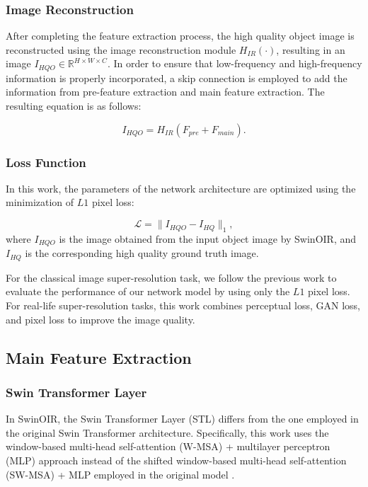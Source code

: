 \documentclass[default,iicol]{sn-jnl}
\theoremstyle{thmstyleone}\newtheorem{theorem}{Theorem}\newtheorem{proposition}[theorem]{Proposition}
\theoremstyle{thmstyletwo}\newtheorem{example}{Example}\newtheorem{remark}{Remark}\theoremstyle{thmstylethree}\newtheorem{definition}{Definition}
\begin{document}
\subsubsection{Image Reconstruction}
After completing the feature extraction process, the high quality object image is reconstructed using the image reconstruction module $H_{\textit{IR}}(\cdot)$, resulting in an image $I_{\textit{HQO}}\in\mathbb{R}^{H\times W\times C}$. In order to ensure that low-frequency and high-frequency information is properly incorporated, a skip connection is employed to add the information from pre-feature extraction and main feature extraction. The resulting equation is as follows:

\begin{equation}
I_{\textit{HQO}}=H_{\textit{IR}}(F_{\textit{pre}}+F_{\textit{main}}).
\end{equation}

\subsubsection{Loss Function}
In this work, the parameters of the network architecture are optimized using the minimization of $L1$ pixel loss:

\begin{equation}
\mathcal{L}=\| I_{\textit{HQO}}-I_{\textit{HQ}}\|_1,
\end{equation}
where $I_{\textit{HQO}}$ is the image obtained from the input object image by SwinOIR, and $I_{\textit{HQ}}$ is the corresponding high quality ground truth image.

For the classical image super-resolution task, we follow the previous work to evaluate the performance of our network model by using only the $L1$ pixel loss. For real-life super-resolution tasks, this work combines perceptual loss, GAN loss, and pixel loss \cite{goodfellow2020generative}\cite{johnson2016perceptual}\cite{wang2021real}\cite{wang2018esrgan}\cite{zhang2021designing} to improve the image quality.

\subsection{Main Feature Extraction}
\label{MFE}
\subsubsection{Swin Transformer Layer}
In SwinOIR, the Swin Transformer Layer (STL) differs from the one employed in the original Swin Transformer \cite{liu2021swin} architecture. Specifically, this work uses the window-based multi-head self-attention (W-MSA) + multilayer perceptron (MLP) approach instead of the shifted window-based multi-head self-attention (SW-MSA) + MLP employed in the original model \cite{liang2021swinir}.
\end{document}
